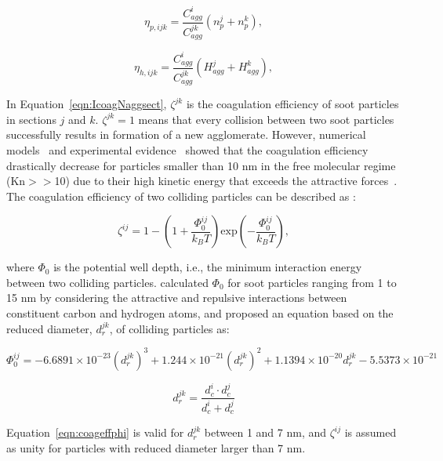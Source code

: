 \begin{equation}
	\eta_{p,ijk}=
	\frac{C^i_{agg}}{C^{jk}_{agg}}
	\left(
	n^j_p + n^k_p
	\right)
	\label{eqn:etapcoag},
\end{equation}

\begin{equation}
	\eta_{h,ijk}=
	\frac{C^i_{agg}}{C^{jk}_{agg}}
	\left(
	H^j_{agg} + H^k_{agg}
	\right)
	\label{eqn:etahcoag},
\end{equation}


In Equation~\eqref{eqn:IcoagNaggsect}, $\zeta^{jk}$ is the coagulation efficiency of soot particles in sections $j$ and $k$. $\zeta^{jk}=1$ means that every collision between two soot particles successfully results in formation of a new agglomerate. However, numerical models~\citep{narsimhan1985brownian} and experimental evidence~\citep{d2005surface} showed that the coagulation efficiency drastically decrease for particles smaller than 10 nm in the free molecular regime (Kn$>>$10) due to their high kinetic energy that exceeds the attractive forces~\citep{wang1991filtration}. The coagulation efficiency of two colliding particles can be described as \cite{narsimhan1985brownian}:

\begin{equation}
	\zeta^{ij} = 1 - 
	\left(1 + \frac{\Phi^{ij}_0}{k_BT} \right)
	\mathrm{exp}\left(-\frac{\Phi^{ij}_0}{k_BT}\right),
	\label{eqn:coageff}
\end{equation}

\noindent where $\Phi_0$ is the potential well depth, i.e., the minimum interaction energy between two colliding particles. \citet{hou2020coagulation} calculated $\Phi_0$ for soot particles ranging from 1 to 15 nm by considering the attractive and repulsive interactions between constituent carbon and hydrogen atoms, and proposed an equation based on the reduced diameter, $d^{jk}_r$, of colliding particles as:

\begin{equation}
	\Phi^{ij}_0 = -6.6891\times10^{-23} (d^{jk}_r)^3 + 1.244\times10^{-21} (d^{jk}_r)^2 + 1.1394\times10^{-20} d^{jk}_r - 5.5373\times10^{-21}
	\label{eqn:coageffphi}
\end{equation}

\begin{equation}
	d^{jk}_r = \frac{d^i_c\cdot d^j_c}{d^i_c+d^j_c}
	\label{eqn:coageffredcueddia}
\end{equation}

Equation~\eqref{eqn:coageffphi} is valid for $d^{jk}_r$ between 1 and 7 nm, and $\zeta^{ij}$ is assumed as unity for particles with reduced diameter larger than 7 nm.


